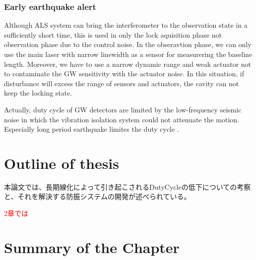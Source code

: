 \subsubsection{Early earthquake alert}
Although ALS system can bring the interferometer to the observation state in a sufficiently short time, this is used in only the lock aquisition phase not observation phase due to the control noise. In the obseravtion phase, we can only use the main laser with narrow linewidth as a sensor for measurering the baseline length. Moreover, we have to use a narrow dynamic range and weak actuator not to contaminate the GW sensitivity with the actuator noise. In this situation, if disturbance will excess the range of sensors and actuators, the cavity can not keep the locking state. 

Actually, duty cycle of GW detectors are limited by the low-frequency seismic noise in which the vibration isolation system could not attenuate the motion. Especially long period earthquake limites the duty cycle \cite{Biscans2018control}. 

\section{Outline of thesis}
本論文では、長期線化によって引き起こされるDutyCycleの低下についての考察と、それを解決する防振システムの開発が述べられている。

\textcolor{red}{2章では}


\section{Summary of the Chapter}
